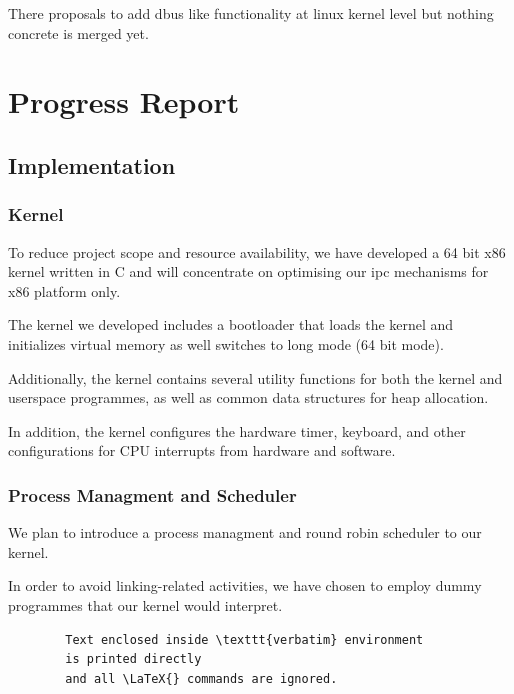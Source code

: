 \documentclass[12pt]{report}
\begin{document}
	There proposals to add dbus like functionality at linux kernel level but nothing
	concrete is merged yet\cite{citation03}.	
	
    \chapter{Progress Report}
	
	\section{Implementation}
	
	\subsection{Kernel}
	To reduce project scope and resource availability, 
	we have developed a 64 bit x86 kernel written in C and will concentrate 
	on optimising our ipc mechanisms for x86 platform only.
	
	The kernel we developed includes a bootloader that loads the kernel and initializes virtual memory
	as well switches to long mode (64 bit mode).
	
	Additionally, the kernel contains several utility functions for both the kernel and userspace programmes, 
	as well as common data structures for heap allocation. 
	
	In addition, the kernel configures the hardware timer, keyboard, and other configurations for CPU interrupts 
	from hardware and software.
	
	\subsection{Process Managment and Scheduler}
	We plan to introduce a process managment and round robin scheduler
	to our kernel.
	
	In order to avoid linking-related activities, we have chosen to employ dummy programmes that 
	our kernel would interpret.
	
	\begin{verbatim}
		Text enclosed inside \texttt{verbatim} environment 
		is printed directly 
		and all \LaTeX{} commands are ignored.
	\end{verbatim}

	
	
\end{document}

